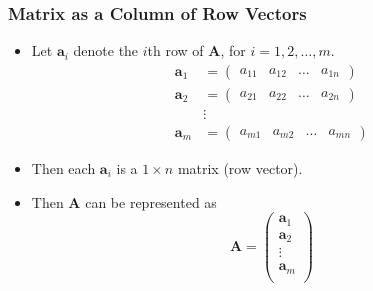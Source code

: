\documentclass[../ma2001_notes.tex]{subfiles}
\begin{document}
\subsubsection{Matrix as a Column of Row Vectors}
\begin{itemize}
	\item Let \(\bm{a}_i\) denote the \(i\)th row of \(\bm{A}\), for \(i=1,2,\ldots,m\).
	\begin{align*}
		\bm{a}_1 &= \begin{pmatrix}
			a_{11} & a_{12} & \ldots & a_{1n}
		\end{pmatrix} \\
		\bm{a}_2 &= \begin{pmatrix}
			a_{21} & a_{22} & \ldots & a_{2n}
		\end{pmatrix} \\
		&\vdots \\
		\bm{a}_m &= \begin{pmatrix}
			a_{m1} & a_{m2} & \ldots & a_{mn}
		\end{pmatrix}
	\end{align*}
	\item Then each \(\bm{a}_i\) is a \(1\times n\) matrix (row vector).
	\item Then \(\bm{A}\) can be represented as
	\[\bm{A}=\left(\begin{array}{c}
		\bm{a}_1 \\
		\bm{a}_2 \\
		\vdots \\
		\bm{a}_m \\
	\end{array}\right)\]
\end{itemize}
\end{document}
